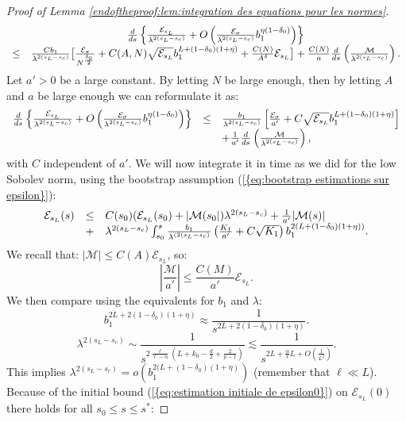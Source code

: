 \documentclass[11pt,a4paper,reqno]{amsart}
\theoremstyle{remark}
\numberwithin{equation}{section}
\begin{document}
\begin{proof}[ Proof of Lemma \ref{endoftheproof:lem:integration des equations pour les normes}]
$$
\begin{array}{r c l}
&\frac{d}{ds}\left\{ \frac{\mathcal{E}_{s_L}}{\lambda^{2(s_L-s_c)}}+O\left( \frac{\mathcal{E}_{\sigma}}{\lambda^{2(s_L-s_c)}}b_1^{\eta(1-\delta_0)}\right) \right\}\\
 \leq & \frac{Cb_1}{\lambda^{2(s_L-s_c)}}   \big{[} \frac{\mathcal{E}_{\sigma}}{N^{\frac{\delta_0}{2}}} + C(A,N)\sqrt{\mathcal{E}_{s_L}}b_1^{L+(1-\delta_0)(1+\eta)} +\frac{C(N)}{A^{\delta}}\mathcal{E}_{s_L}\big{]}+\frac{C(N)}{a} \frac{d}{ds}\left( \frac{\mathcal{M}}{\lambda^{2(s_L-s_c)}} \right) .
\end{array}
$$
Let $a'>0$ be a large constant. By letting $N$ be large enough, then by letting $A$ and $a$ be large enough we can reformulate it as:
$$
\begin{array}{r c l}
\frac{d}{ds}\left\{ \frac{\mathcal{E}_{s_L}}{\lambda^{2(s_L-s_c)}}+O\left( \frac{\mathcal{E}_{\sigma}}{\lambda^{2(s_L-s_c)}}b_1^{\eta(1-\delta_0)}\right) \right\} &\leq& \frac{b_1}{\lambda^{2(s_L-s_c)}} \left[ \frac{\mathcal{E}_{\sigma}}{a'} + C\sqrt{\mathcal{E}_{s_L}}b_1^{L+(1-\delta_0)(1+\eta)}\right]\\
&&+\frac{1}{a'} \frac{d}{ds}\left( \frac{\mathcal{M}}{\lambda^{2(s_L-s_c)}} \right) ,
\end{array}
$$
with $C$ independent of $a'$. We will now integrate it in time as we did for the low Sobolev norm, using the bootstrap assumption {{\rm (\ref{{eq:bootstrap estimations sur epsilon}})}}:
$$
\begin{array}{r c l}
\mathcal{E}_{s_L}(s)&\leq& C(s_0)(\mathcal{E}_{s_L}(s_0)+|\mathcal{M}(s_0|)\lambda^{2(s_L-s_c)}+\frac{1}{a'}|\mathcal{M}(s)| \\
&+&\lambda^{2(s_L-s_c)}\int_{s_0}^s \frac{b_1}{\lambda^{(2(s_L-s_c)}}\left( \frac{K_1}{a'}+C\sqrt{K_1}\right)b_1^{2(L+(1-\delta_0)(1+\eta))} .
\end{array}
$$
We recall that: $|\mathcal{M}|\leq C(A)\mathcal{E}_{s_L}$, so:
$$
\left| \frac{\mathcal{M}}{a'} \right|\leq \frac{C(M)}{a'}\mathcal{E}_{s_L}  .
$$
We then compare using the equivalents for $b_1$ and $\lambda$: 
$$
b_1^{2L+2(1-\delta_0)(1+\eta)}\approx \frac{1}{s^{2L+2(1-\delta_0)(1+\eta)}} .
$$
$$
\lambda^{2(s_L-s_c)}\sim \frac{1}{s^{2\frac{\ell}{\ell-\alpha}(L+k_0-\frac{d}{2}+\frac{2}{p-1})}}\lesssim \frac{1}{s^{2L+\frac{\alpha}{\ell}L+O\left(\frac{1}{L^2} \right)}}  .
$$
This implies $\lambda^{2(s_L-s_c)}=o(b_1^{2(L+(1-\delta_0)(1+\eta)})$ (remember that $\ell \ll L$). Because of the initial bound {{\rm (\ref{{eq:estimation initiale de epsilon0}})}} on $\mathcal{E}_{s_L}(0)$ there holds for all $s_0\leq s\leq s^*$:

\end{proof}
\end{document}
